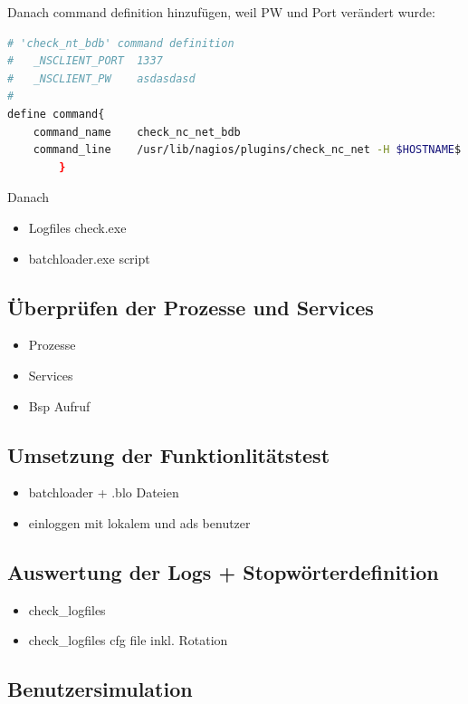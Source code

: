 Danach command definition hinzufügen, weil PW und Port verändert wurde:
\begin{lstlisting}[captionpos=b, caption=Nagios-Befehls Definition für den Host, label=cmddefbdb, breaklines = true, language=sh]
# 'check_nt_bdb' command definition
#	_NSCLIENT_PORT	1337
#	_NSCLIENT_PW	asdasdasd
#
define command{
    command_name    check_nc_net_bdb
	command_line 	/usr/lib/nagios/plugins/check_nc_net -H $HOSTNAME$ -p 1337 -s asdasdasd -v $ARG1$
        }
\end{lstlisting}

Danach
\begin{itemize}
\item Logfiles check.exe 
\item batchloader.exe script
\end{itemize}


\subsection{Überprüfen der Prozesse und Services}
\begin{itemize}
\item Prozesse
\item Services
\item Bsp Aufruf
\end{itemize}

\subsection{Umsetzung der Funktionlitätstest}
\begin{itemize}
\item batchloader + .blo Dateien
\item einloggen mit lokalem und ads benutzer
\end{itemize}



\subsection{Auswertung der Logs + Stopwörterdefinition}
\begin{itemize}
\item check\_logfiles
\item check\_logfiles cfg file inkl. Rotation
\end{itemize}

\subsection{Benutzersimulation}





